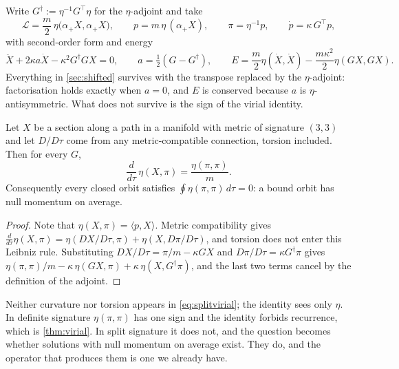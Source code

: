 Write $G^\dagger:=\eta^{-1}G^{\!\top}\eta$ for the $\eta$-adjoint and take
\begin{equation}
\label{eq:splitL}
\mathcal L=\frac m2\,\eta\bigl(\alpha_+X,\alpha_+X\bigr),\qquad p=m\,\eta\,(\alpha_+X),\qquad \pi=\eta^{-1}p,\qquad \dot p=\kappa\,G^{\!\top}p ,
\end{equation}
with second-order form and energy
\begin{equation}
\label{eq:splitEg}
\ddot X+2\kappa a\dot X-\kappa^2G^\dagger GX=0,\qquad a=\tfrac12(G-G^\dagger),\qquad E=\frac m2\eta(\dot X,\dot X)-\frac{m\kappa^2}2\eta(GX,GX).
\end{equation}
Everything in \cref{sec:shifted} survives with the transpose replaced by the $\eta$-adjoint: factorisation holds exactly when $a=0$, and $E$
is conserved because $a$ is $\eta$-antisymmetric. What does not survive is the sign of the virial identity.

\begin{theorem}
\label{thm:splitvirial}
Let $X$ be a section along a path in a manifold with metric of signature $(3,3)$ and let $D/D\tau$ come from any metric-compatible connection,
torsion included. Then for every $G$,
\begin{equation}
\label{eq:splitvirial}
\frac{d}{d\tau}\,\eta(X,\pi)=\frac{\eta(\pi,\pi)}m .
\end{equation}
Consequently every closed orbit satisfies $\oint\eta(\pi,\pi)\,d\tau=0$: a bound orbit has null momentum on average.
\end{theorem}

\begin{proof}
Note that $\eta(X,\pi)=\langle p,X\rangle$. Metric compatibility gives $\tfrac{d}{d\tau}\eta(X,\pi)=\eta(DX/D\tau,\pi)+\eta(X,D\pi/D\tau)$, and torsion does
not enter this Leibniz rule. Substituting $DX/D\tau=\pi/m-\kappa GX$ and $D\pi/D\tau=\kappa G^\dagger\pi$ gives $\eta(\pi,\pi)/m-\kappa\,\eta(GX,\pi)+\kappa\,\eta(X,G^\dagger\pi)$,
and the last two terms cancel by the definition of the adjoint.
\end{proof}

Neither curvature nor torsion appears in \eqref{eq:splitvirial}; the identity sees only $\eta$. In definite signature $\eta(\pi,\pi)$ has
one sign and the identity forbids recurrence, which is \cref{thm:virial}. In split signature it does not, and the question becomes whether
solutions with null momentum on average exist. They do, and the operator that produces them is one we already have.

